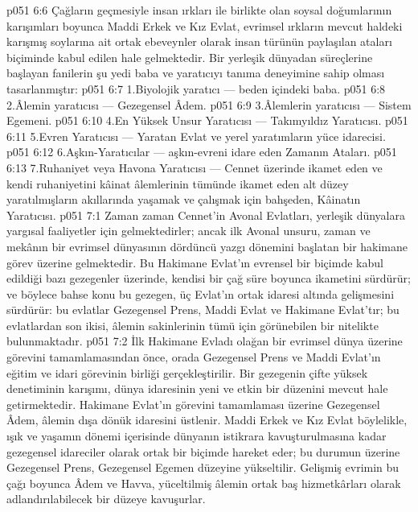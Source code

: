 \vs p051 6:6 Çağların geçmesiyle insan ırkları ile birlikte olan soysal doğumlarının karışımları boyunca Maddi Erkek ve Kız Evlat, evrimsel ırkların mevcut haldeki karışmış soylarına ait ortak ebeveynler olarak insan türünün paylaşılan ataları biçiminde kabul edilen hale gelmektedir. Bir yerleşik dünyadan süreçlerine başlayan fanilerin şu yedi baba ve yaratıcıyı tanıma deneyimine sahip olması tasarlanmıştır:
\vs p051 6:7 1.\bibnobreakspace Biyolojik yaratıcı --- beden içindeki baba.
\vs p051 6:8 2.\bibnobreakspace Âlemin yaratıcısı --- Gezegensel Âdem.
\vs p051 6:9 3.\bibnobreakspace Âlemlerin yaratıcısı --- Sistem Egemeni.
\vs p051 6:10 4.\bibnobreakspace En Yüksek Unsur Yaratıcısı --- Takımyıldız Yaratıcısı.
\vs p051 6:11 5.\bibnobreakspace Evren Yaratıcısı --- Yaratan Evlat ve yerel yaratımların yüce idarecisi.
\vs p051 6:12 6.\bibnobreakspace Aşkın\hyp{}Yaratıcılar --- aşkın\hyp{}evreni idare eden Zamanın Ataları.
\vs p051 6:13 7.\bibnobreakspace Ruhaniyet veya Havona Yaratıcısı --- Cennet üzerinde ikamet eden ve kendi ruhaniyetini kâinat âlemlerinin tümünde ikamet eden alt düzey yaratılmışların akıllarında yaşamak ve çalışmak için bahşeden, Kâinatın Yaratıcısı.
\vs p051 7:1 Zaman zaman Cennet’in Avonal Evlatları, yerleşik dünyalara yargısal faaliyetler için gelmektedirler; ancak ilk Avonal unsuru, zaman ve mekânın bir evrimsel dünyasının dördüncü yazgı dönemini başlatan bir hakimane görev üzerine gelmektedir. Bu Hakimane Evlat’ın evrensel bir biçimde kabul edildiği bazı gezegenler üzerinde, kendisi bir çağ süre boyunca ikametini sürdürür; ve böylece bahse konu bu gezegen, üç Evlat’ın ortak idaresi altında gelişmesini sürdürür: bu evlatlar Gezegensel Prens, Maddi Evlat ve Hakimane Evlat’tır; bu evlatlardan son ikisi, âlemin sakinlerinin tümü için görünebilen bir nitelikte bulunmaktadır.
\vs p051 7:2 İlk Hakimane Evladı olağan bir evrimsel dünya üzerine görevini tamamlamasından önce, orada Gezegensel Prens ve Maddi Evlat’ın eğitim ve idari görevinin birliği gerçekleştirilir. Bir gezegenin çifte yüksek denetiminin karışımı, dünya idaresinin yeni ve etkin bir düzenini mevcut hale getirmektedir. Hakimane Evlat’ın görevini tamamlaması üzerine Gezegensel Âdem, âlemin dışa dönük idaresini üstlenir. Maddi Erkek ve Kız Evlat böylelikle, ışık ve yaşamın dönemi içerisinde dünyanın istikrara kavuşturulmasına kadar gezegensel idareciler olarak ortak bir biçimde hareket eder; bu durumun üzerine Gezegensel Prens, Gezegensel Egemen düzeyine yükseltilir. Gelişmiş evrimin bu çağı boyunca Âdem ve Havva, yüceltilmiş âlemin ortak baş hizmetkârları olarak adlandırılabilecek bir düzeye kavuşurlar.
